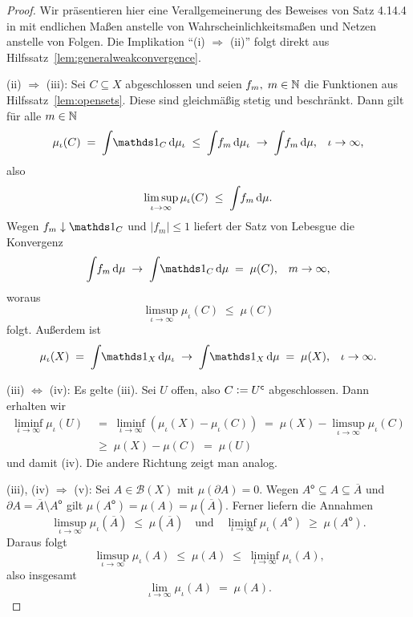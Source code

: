 \documentclass[../main/main.tex]{subfiles}
\begin{document}
	\begin{proof}
		Wir präsentieren hier eine Verallgemeinerung des Beweises von Satz 4.14.4 in \cite[Kapitel 4.14]{Simon.2015} mit endlichen Maßen 
		anstelle von Wahrscheinlichkeitsmaßen und Netzen anstelle von Folgen. Die Implikation \enquote{(i) $\Rightarrow$ (ii)} folgt 
		direkt aus Hilfssatz~\ref{lem:generalweakconvergence}. 
		
		(ii) $\Rightarrow$ (iii): Sei $C \subseteq X$ abgeschlossen und seien 
		$f_m, \; m \in \mathbb{N}$ die Funktionen aus Hilfssatz~\ref{lem:opensets}. 
		Diese sind gleichmäßig stetig und beschränkt.
		Dann gilt für alle $m \in \mathbb{N}$
		$$\mu_\iota(C) \; = \; \measureint{}{\indfct_C}{\mu_\iota} \; \leq \; 
		\measureint{}{f_m}{\mu_\iota} \; \to \;
		\measureint{}{f_m}{\mu} \text{,} \quad \iota \to \infty \text{,}$$
		also 
		$$\limsup_{\iota \to \infty} \mu_\iota(C) \; \leq \; 
		\int_{} \, f_m \, \mathrm{d}\mu \text{.}$$
		Wegen $f_m \convdown \indfct_C$ und $| f_m | \leq 1$ 
		liefert der Satz von Lebesgue die Konvergenz
		$$\measureint{}{f_m}{\mu} \; \to \;
		\measureint{}{\indfct_C}{\mu} \; = \; \mu(C) \text{,} 
		\quad m \to \infty \text{,}$$
		woraus
		$$\limsup_{\iota \to \infty} \mu_\iota(C) \; \leq \; \mu(C)$$
		folgt. Außerdem ist 
		$$\mu_\iota(X) \; = \; \measureint{}{\indfct_{X}}{\mu_\iota} \; \to \; \measureint{}{\indfct_{X}}{\mu} \; = \; \mu(X) \text{,} 
		\quad \iota \to \infty \text{.}$$
		
		(iii) $\Leftrightarrow$ (iv): Es gelte (iii). Sei $U$ offen, also 
		$C \vcentcolon = U^\mathsf{c}$ abgeschlossen. Dann erhalten wir
		\begin{align*}
			\liminf_{\iota \to \infty} \mu_\iota(U) \; &= \; \liminf_{\iota \to \infty} (\mu_\iota(X) - \mu_\iota(C)) \; = \;
			\mu(X) - \limsup_{\iota \to \infty} \mu_\iota(C) \\
			&\geq \; 
			\mu(X) - \mu(C) \; = \; \mu(U)
		\end{align*}
		und damit (iv). Die andere Richtung zeigt man analog.
		
		(iii), (iv) $\Rightarrow$ (v): Sei $A \in \mathcal{B}(X)$ mit 
		$\mu(\partial A) = 0$. Wegen
		$A^\mathsf{o} \subseteq A \subseteq \overline{A}$ und 
		$\partial A = \overline{A} \setminus A^\mathsf{o}$ gilt $\mu(A^\mathsf{o}) = 
		\mu(A) = \mu(\overline{A}) \text{.}$
		Ferner liefern die Annahmen
		$$\limsup_{\iota \to \infty} \mu_\iota(\overline{A}) \; \leq \; 
		\mu(\overline{A}) \quad \text{und} \quad 
		\liminf_{\iota \to \infty} \mu_\iota(A^\mathsf{o}) \; \geq \; 
		\mu(A^\mathsf{o}) \text{.}$$
		Daraus folgt
		$$\limsup_{\iota \to \infty} \mu_\iota(A) \; \leq \; 
		\mu(A) \; \leq \; \liminf_{\iota \to \infty} \mu_\iota(A) \text{,}$$
		also insgesamt
		$$\lim_{\iota \to \infty} \mu_\iota(A) \; = \; \mu(A) \text{.}$$
		

\end{proof}
\end{document}
